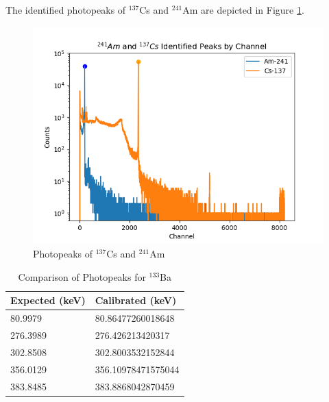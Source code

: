The identified photopeaks of $^{137}$Cs and $^{241}$Am are depicted in Figure \ref{fig:Peaks}.

\begin{figure}[H]
\centering
\includegraphics[scale=0.8]{images/Peaks.png}
\caption{Photopeaks of $^{137}$Cs and $^{241}$Am}
\label{fig:Peaks}
\end{figure}

\begin{table}[H]
\centering
\caption{Comparison of Photopeaks for $^{133}$Ba}
\label{tab:Comp}
\begin{tabular}{@{}ll@{}}
Expected (keV) & Calibrated (keV) \\ \midrule
80.9979 & 80.86477260018648 \\
276.3989 & 276.426213420317 \\
302.8508 & 302.8003532152844 \\
356.0129 & 356.10978471575044 \\
383.8485 & 383.8868042870459
\end{tabular}
\end{table}
